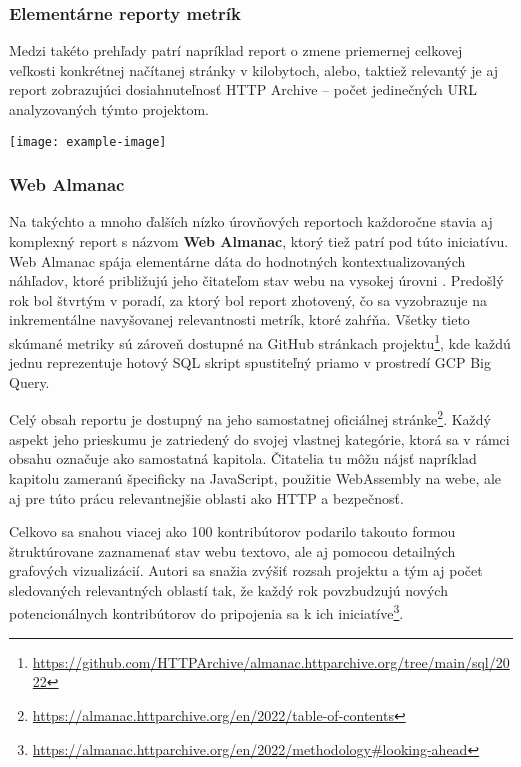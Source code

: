 \subsubsection{Elementárne reporty metrík}
Medzi takéto prehľady patrí napríklad report o zmene priemernej celkovej veľkosti konkrétnej načítanej stránky v kilobytoch, alebo, taktiež relevantý je aj report zobrazujúci dosiahnuteľnosť HTTP Archive --
počet jedinečných URL analyzovaných týmto projektom.

\begin{center}
\noindent\texttt{[image: example-image]}    
\end{center}


\subsubsection{Web Almanac}
Na takýchto a mnoho ďalších nízko úrovňových reportoch každoročne stavia aj komplexný report s názvom \textbf{Web Almanac}, ktorý tiež patrí pod túto iniciatívu.
Web Almanac spája elementárne dáta do hodnotných kontextualizovaných náhľadov, ktoré približujú jeho čitateľom stav webu na vysokej úrovni \cite{httparchive-methodology}.
Predošlý rok bol štvrtým v poradí, za ktorý bol report zhotovený, čo sa vyzobrazuje na inkrementálne navyšovanej relevantnosti metrík, ktoré zahŕňa. 
Všetky tieto skúmané metriky sú zároveň dostupné na GitHub stránkach projektu\footnote{\href{https://github.com/HTTPArchive/almanac.httparchive.org/tree/main/sql/2022}{https://github.com/HTTPArchive/almanac.httparchive.org/tree/main/sql/2022}}, kde každú jednu reprezentuje hotový SQL skript spustiteľný priamo v prostredí GCP Big Query.


Celý obsah reportu je dostupný na jeho samostatnej oficiálnej stránke\footnote{\href{https://almanac.httparchive.org/en/2022/table-of-contents}{https://almanac.httparchive.org/en/2022/table-of-contents}}. 
Každý aspekt jeho prieskumu je zatriedený do svojej vlastnej kategórie, ktorá sa v rámci obsahu označuje ako samostatná kapitola.
Čitatelia tu môžu nájsť napríklad kapitolu zameranú špecificky na JavaScript, použitie WebAssembly na webe, ale aj pre túto prácu relevantnejšie oblasti ako HTTP a bezpečnosť.

Celkovo sa snahou viacej ako 100 kontribútorov podarilo takouto formou štruktúrovane zaznamenať stav webu textovo, ale aj pomocou detailných grafových vizualizácií.
Autori sa snažia zvýšiť rozsah projektu a tým aj počet sledovaných relevantných oblastí tak, že každý rok povzbudzujú nových potencionálnych kontribútorov do pripojenia sa k ich iniciatíve\footnote{\href{https://almanac.httparchive.org/en/2022/methodology\#looking-ahead}{https://almanac.httparchive.org/en/2022/methodology\#looking-ahead}}. 

